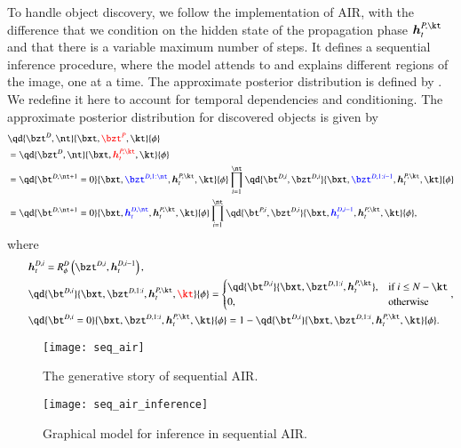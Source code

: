 To handle object discovery, we follow the implementation of AIR, with the difference that we condition on the hidden state of the propagation phase $\bm{h}_t^{P, \kt}$ and that there is a variable maximum number of steps. It defines a sequential inference procedure, where the model attends to and explains different regions of the image, one at a time. The approximate posterior distribution is defined by .
We redefine it here to account for temporal dependencies and conditioning. The approximate posterior distribution for discovered objects is given by
\begin{equation}
\begin{aligned}
    &\qd{\bzt^D, \nt}{\bxt, \textcolor{red}{\bzt^P}, \kt}{\phi}\\
%    
    &= \qd{\bzt^D, \nt}{\bxt, \textcolor{red}{\bm{h}_t^{P, \kt}}, \kt}{\phi}\\
%    
    &= \qd{\bt^{D, \nt + 1} = 0}{\bxt, \textcolor{blue}{\bzt^{D, 1:\nt}}, \bm{h}_t^{P, \kt}, \kt}{\phi} \prod_{i=1}^{\nt} \qd{\bt^{D, i}, \bzt^{D, i}}{\bxt, \textcolor{blue}{\bzt^{D,1:i-1}}, \bm{h}_t^{P, \kt}, \kt}{\phi}\\
%    
    &= \qd{\bt^{D, \nt + 1} = 0}{\bxt, \textcolor{blue}{\bm{h}_t^{D, \nt}}, \bm{h}_t^{P, \kt}, \kt}{\phi} \prod_{i=1}^{\nt} \qd{\bt^{P, i}, \bzt^{D, i}}{\bxt, \textcolor{blue}{\bm{h}_t^{D, i-1}}, \bm{h}_t^{P, \kt}, \kt}{\phi},\\
%    
%    
\end{aligned}
\end{equation}
where
\begin{equation}
\begin{aligned}
    &\qquad \bm{h}_t^{D, i} = R_\phi^D \left( \bzt^{D, i}, \bm{h}_t^{D, i-1} \right),\\
%    
    &\qquad \qd{\bt^{D, i}}{\bxt, \bzt^{D, 1:i}, \bm{h}_t^{P, \kt}, \textcolor{red}{\kt}}{\phi} = 
    \begin{cases}
        \qd{\bt^{D, i}}{\bxt, \bzt^{D, 1:i}, \bm{h}_t^{P, \kt}}, & \text{if}\ i \leq N-\kt \\
        0, & \text{otherwise}
    \end{cases},\\
%    
    &\qquad \qd{\bt^{D, i} = 0}{\bxt, \bzt^{D, 1:i}, \bm{h}_t^{P, \kt}, \kt}{\phi} 
    = 1 - \qd{\bt^{D, i}}{\bxt, \bzt^{D, 1:i}, \bm{h}_t^{P, \kt}, \kt}{\phi}.
\end{aligned}
\end{equation}
%


\begin{figure}
    \texttt{[image: seq\_air]}
    \caption{The generative story of sequential AIR.}
    \label{fig:seq_air}
\end{figure}

\begin{figure}
    \texttt{[image: seq\_air\_inference]}
    \caption{Graphical model for inference in sequential AIR.}
    \label{fig:seq_air_inf}
\end{figure}